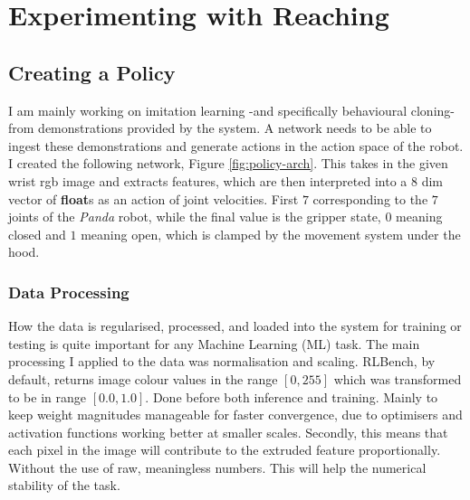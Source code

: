 \section{Experimenting with Reaching}\label{sec:reach-no-obs}

\subsection{Creating a Policy}
I am mainly working on imitation learning -and specifically behavioural cloning- from demonstrations provided by the system. A network needs to be able to ingest these demonstrations and generate actions in the action space of the robot. I created the following network, Figure \ref{fig:policy-arch}. This takes in the given wrist rgb image and extracts features, which are then interpreted into a $8$ dim vector of \textbf{float}s as an action of joint velocities. First $7$ corresponding to the $7$ joints of the \emph{Panda} robot, while the final value is the gripper state, $0$ meaning closed and $1$ meaning open, which is clamped by the movement system under the hood.

\subsubsection{Data Processing}
How the data is regularised, processed, and loaded into the system for training or testing is quite important for any Machine Learning (ML) task. The main processing I applied to the data was normalisation and scaling. RLBench, by default, returns image colour values in the range \(\left[0, 255\right]\) which was transformed to be in range \(\left[0.0, 1.0\right]\). Done before both inference and training. Mainly to keep weight magnitudes manageable for faster convergence, due to optimisers and activation functions working better at smaller scales. Secondly, this means that each pixel in the image will contribute to the extruded feature proportionally. Without the use of raw, meaningless numbers. This will help the numerical stability of the task.


